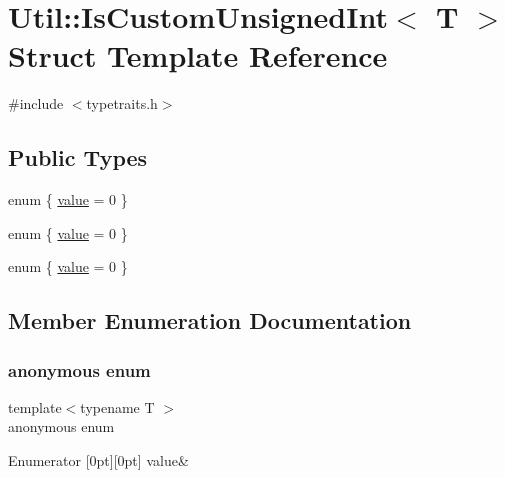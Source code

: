 \hypertarget{structUtil_1_1IsCustomUnsignedInt}{}\section{Util\+:\+:Is\+Custom\+Unsigned\+Int$<$ T $>$ Struct Template Reference}
\label{structUtil_1_1IsCustomUnsignedInt}


{\ttfamily \#include $<$typetraits.\+h$>$}

\subsection*{Public Types}
\begin{DoxyCompactItemize}
\item 
enum \{ \mbox{\hyperlink{structUtil_1_1IsCustomUnsignedInt_a266d8064253174b21230d212ea91f3a9a875066dceb0ae7eba8880348789640d7}{value}} = 0
 \}
\item 
enum \{ \mbox{\hyperlink{structUtil_1_1IsCustomUnsignedInt_a266d8064253174b21230d212ea91f3a9a875066dceb0ae7eba8880348789640d7}{value}} = 0
 \}
\item 
enum \{ \mbox{\hyperlink{structUtil_1_1IsCustomUnsignedInt_a266d8064253174b21230d212ea91f3a9a875066dceb0ae7eba8880348789640d7}{value}} = 0
 \}
\end{DoxyCompactItemize}


\subsection{Member Enumeration Documentation}
\mbox{\label{structUtil_1_1IsCustomUnsignedInt_ab981b43b20e696e46a1400bc11a8e396}} 
\subsubsection{\texorpdfstring{anonymous enum}{anonymous enum}}
{\footnotesize\ttfamily template$<$typename T $>$ \\
anonymous enum}

\begin{DoxyEnumFields}{Enumerator}
[0pt][0pt]{}\mbox{\label{structUtil_1_1IsCustomUnsignedInt_a266d8064253174b21230d212ea91f3a9a875066dceb0ae7eba8880348789640d7}} 
value&\\
\hline

\end{DoxyEnumFields}
\mbox{\label{structUtil_1_1IsCustomUnsignedInt_a3a80eb6cb413962b284849b094b83580}} 
